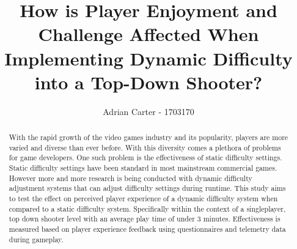 \documentclass[journal]{IEEEtran}
\begin{document}
%
\title{How is Player Enjoyment and Challenge Affected When Implementing Dynamic Difficulty into a Top-Down Shooter?}
%
%
\author{Adrian Carter - 1703170}


\maketitle

\begin{abstract}
With the rapid growth of the video games industry and its popularity, players are more varied and diverse than ever before. With this diversity comes a plethora of problems for game developers. One such problem is the effectiveness of static difficulty settings. Static difficulty settings have been standard in most mainstream commercial games. However more and more research is being conducted with dynamic difficulty adjustment systems that can adjust difficulty settings during runtime. This study aims to test the effect on perceived player experience of a dynamic difficulty system when compared to a static difficulty system. Specifically within the context of a singleplayer, top down shooter level with an average play time of under 3 minutes. Effectiveness is measured based on player experience feedback using questionnaires and telemetry data during gameplay.

\end{abstract}
\end{document}
